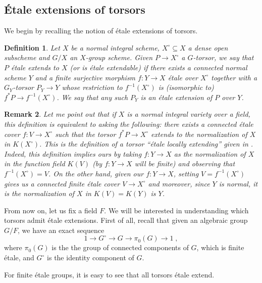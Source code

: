 \documentclass[a4paper,english,12pt]{amsart}
\newtheorem{definition}{Definition}[section]
\newtheorem{remark}[definition]{Remark}
\numberwithin{equation}{section}
\renewcommand{\_}{\rule{0.25cm}{0.4pt}}
\begin{document}
\subsection{Étale extensions of torsors}\label{1.2}
We begin by recalling the notion of étale extensions of torsors.

\begin{definition}\label{etale extension def}
    Let $X$ be a normal integral scheme, $X^{\circ}\subseteq X$ a dense open subscheme and $G/X$ an $X$-group scheme. Given $P\to X^{\circ}$ a $G$-torsor, we say that $P$ étale extends to $X$ (or is étale extendable) if there exists a connected normal scheme $Y$ and a finite surjective morphism $f\colon Y\to X$ étale over $X^{\circ}$ together with a $G_{Y}$-torsor $P_{Y}\to Y$ whose restriction to $f^{-1}(X^{\circ})$ is (isomorphic to) $f^{\ast}P\to f^{-1}(X^{\circ})$. We say that any such $P_{Y}$ is an étale extension of $P$ over $Y$.
\end{definition}

\begin{remark}
    Let me point out that if $X$ is a normal integral variety over a field, this definition is equivalent to asking the following: there exists a connected étale cover $f\colon V\to X^{\circ}$ such that the torsor $f^{\ast}P\to X^{\circ}$ extends to the normalization of $X$ in $K(X^{\circ})$. This is the definition of a torsor ``étale locally extending'' given in \cite[Definition 3.2.]{Biswas2022-dg}. Indeed, this definition implies ours by taking $f\colon Y\to X$ as the normalization of $X$ in the function field $K(V)$ (by \cite[Corollary 12.52]{Gortz2020-zv} $f\colon Y\to X$ will be finite) and observing that $f^{-1}(X^{\circ})=V$. On the other hand, given our $f\colon Y\to X$, setting $V=f^{-1}(X^{\circ})$ gives us a connected finite étale cover $V\to X^{\circ}$ and moreover, since $Y$ is normal, it is the normalization of $X$ in $K(V)=K(Y)$ is $Y$.
\end{remark}

From now on, let us fix a field $F$. We will be interested in understanding which torsors admit étale extensions. First of all, recall that given an algebraic group $G/F$, we have an exact sequence
\[
1\to G^{\circ}\to G\to \pi_{0}(G)\to 1\;,
\]
where $\pi_{0}(G)$ is the the group of connected components of $G$, which is finite étale, and $G^{\circ}$ is the identity component of $G$.

For finite étale groups, it is easy to see that all torsors étale extend.
\end{document}
